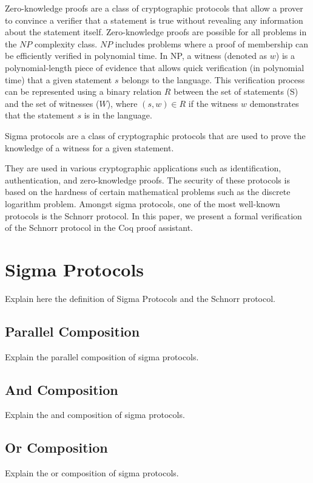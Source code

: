 \documentclass[sigconf]{acmart}
\begin{document}
Zero-knowledge proofs are a class of cryptographic protocols that allow a
prover to convince a verifier that a statement is true without revealing 
any information about the statement itself. 
Zero-knowledge proofs are possible for all problems in the $NP$ complexity class. 
$NP$ includes problems where a proof of membership can be efficiently 
verified in polynomial time. In NP, a witness (denoted as $w$) is a 
polynomial-length piece of evidence that allows quick
verification (in polynomial time) that a given statement $s$ 
belongs to the language. This verification process can be represented 
using a binary relation $R$ between the set of statements (S) and the 
set of witnesses ($W$), where $(s, w) \in R$ if the witness $w$ 
demonstrates that the statement $s$ is in the language. 



Sigma protocols are a class of cryptographic protocols that are used to prove the 
knowledge of a witness for a given statement. 

They are used in various cryptographic 
applications such as identification, authentication, and zero-knowledge proofs. 
The security of these protocols is based on the hardness of certain mathematical 
problems such as the discrete logarithm problem. Amongst sigma protocols, 
one of the most well-known protocols is the Schnorr protocol. In this 
paper, we present a formal verification of the Schnorr protocol in the
Coq proof assistant. 


\section{Sigma Protocols}

  Explain here the definition of Sigma Protocols and the Schnorr protocol. 

  \subsection{Parallel Composition}
  Explain the parallel composition of sigma protocols.

  \subsection{And Composition}
  Explain the and composition of sigma protocols.

  \subsection{Or Composition}
  Explain the or composition of sigma protocols.
\end{document}
